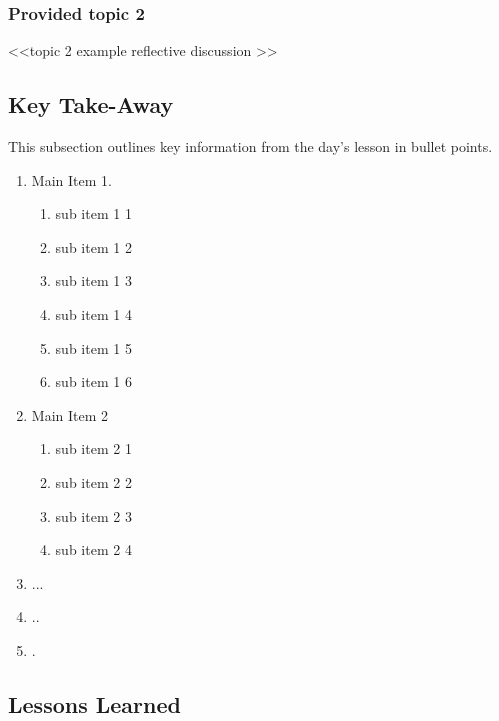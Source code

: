 \subsubsection{Provided topic 2}

<<topic 2 example reflective discussion >>






\subsection{Key Take-Away}

This subsection outlines key information from the day's lesson in bullet points.

\begin{enumerate}
    \item Main Item 1.
    \begin{enumerate}
        \item sub item 1 1
        \item sub item 1 2
        \item sub item 1 3
        \item sub item 1 4
        \item sub item 1 5
        \item sub item 1 6
    \end{enumerate}
    \item Main Item 2
    \begin{enumerate}
        \item sub item 2 1
        \item sub item 2 2
        \item sub item 2 3
        \item sub item 2 4
    \end{enumerate}
    \item ...
    \item ..
    \item .
\end{enumerate}


\subsection{Lessons Learned}

